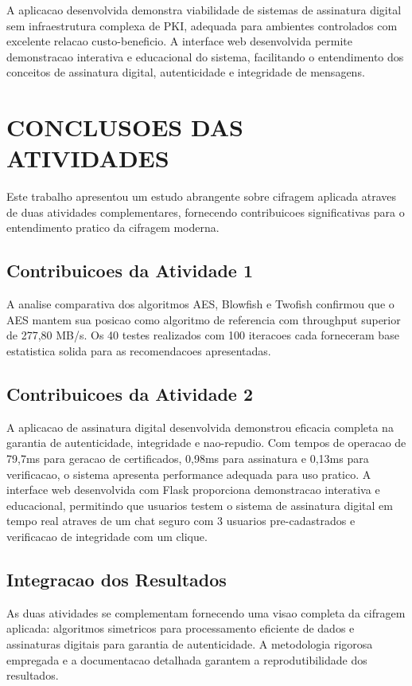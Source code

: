 \documentclass[12pt,a4paper,oneside]{article}
\begin{document}
A aplicacao desenvolvida demonstra viabilidade de sistemas de assinatura digital sem infraestrutura complexa de PKI, adequada para ambientes controlados com excelente relacao custo-beneficio. A interface web desenvolvida permite demonstracao interativa e educacional do sistema, facilitando o entendimento dos conceitos de assinatura digital, autenticidade e integridade de mensagens.

\section{CONCLUSOES DAS ATIVIDADES}

Este trabalho apresentou um estudo abrangente sobre cifragem aplicada atraves de duas atividades complementares, fornecendo contribuicoes significativas para o entendimento pratico da cifragem moderna.

\subsection{Contribuicoes da Atividade 1}

A analise comparativa dos algoritmos AES, Blowfish e Twofish confirmou que o AES mantem sua posicao como algoritmo de referencia com throughput superior de 277,80 MB/s. Os 40 testes realizados com 100 iteracoes cada forneceram base estatistica solida para as recomendacoes apresentadas.

\subsection{Contribuicoes da Atividade 2}

A aplicacao de assinatura digital desenvolvida demonstrou eficacia completa na garantia de autenticidade, integridade e nao-repudio. Com tempos de operacao de 79,7ms para geracao de certificados, 0,98ms para assinatura e 0,13ms para verificacao, o sistema apresenta performance adequada para uso pratico. A interface web desenvolvida com Flask proporciona demonstracao interativa e educacional, permitindo que usuarios testem o sistema de assinatura digital em tempo real atraves de um chat seguro com 3 usuarios pre-cadastrados e verificacao de integridade com um clique.

\subsection{Integracao dos Resultados}

As duas atividades se complementam fornecendo uma visao completa da cifragem aplicada: algoritmos simetricos para processamento eficiente de dados e assinaturas digitais para garantia de autenticidade. A metodologia rigorosa empregada e a documentacao detalhada garantem a reprodutibilidade dos resultados.
\end{document}
